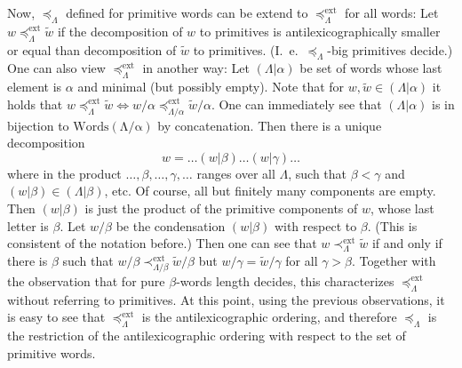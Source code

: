 \documentclass[11pt,a4paper]{amsart}
\newcommand{\snewpage}{}
\newcommand{\snewpage}{\newpage}
\newcommand{\snewpage}{}
\newcommand{\ext}{\mathrm{ext}}
\theoremstyle{definition}
\theoremstyle{plain}
\begin{document}
Now, $\preccurlyeq_\Lambda$ defined for primitive words can be extend to  $\preccurlyeq_\Lambda^\ext$ for all words:
Let $w \preccurlyeq_\Lambda^\ext \tilde w$ if the decomposition of $w$ to primitives is antilexicographically
 smaller or equal than decomposition of $\tilde w$ to primitives.
(I.~e.~$\preccurlyeq_\Lambda$-big primitives decide.)
One can also view $\preccurlyeq_\Lambda^\ext$ in another way:
Let $(\Lambda|\alpha)$ be set of words whose last element is $\alpha$ and minimal (but possibly empty).
Note that for $w,\tilde w\in (\Lambda|\alpha)$ it holds that
 $w \preccurlyeq_\Lambda^\ext\tilde w \Leftrightarrow w/\alpha \preccurlyeq_{\Lambda/\alpha}^\ext\tilde w/\alpha$.
One can immediately see that $(\Lambda|\alpha) $ is in bijection to $\mathrm{Words( \Lambda/\alpha)}$ by concatenation.
Then there is a unique decomposition
\begin{equation*} w= \ldots (w|\beta)\ldots (w|\gamma)\ldots \end{equation*}
 where in the product $\ldots,\beta,\ldots,\gamma,\ldots$ ranges over all $\Lambda$, such that $\beta<\gamma$
 and $(w|\beta)\in (\Lambda|\beta)$, etc.
Of course, all but finitely many components are empty.
Then $(w|\beta)$ is just the product of the primitive components of $w$, whose last letter is $\beta$.
Let $w/\beta$ be the condensation $(w|\beta)$ with respect to $\beta$.
(This is consistent of the notation before.)
Then one can see that $w\prec_\Lambda^\ext \tilde w$ if and only if there is $\beta$ such that
 $w/\beta \prec^\ext_{\Lambda/\beta}\tilde w/\beta$ but $w/\gamma =\tilde w/\gamma$ for all $\gamma>\beta$.
Together with the observation that for pure $\beta$-words length decides, this characterizes
 $\preccurlyeq_\Lambda^\ext$ without referring to primitives.
At this point, using the previous observations, it is easy to see that
 $\preccurlyeq_\Lambda^\ext$ is   the antilexicographic ordering, and therefore $\preccurlyeq_\Lambda$
 is the restriction of the antilexicographic ordering with respect to the set of primitive words.
\snewpage
\end{document}
